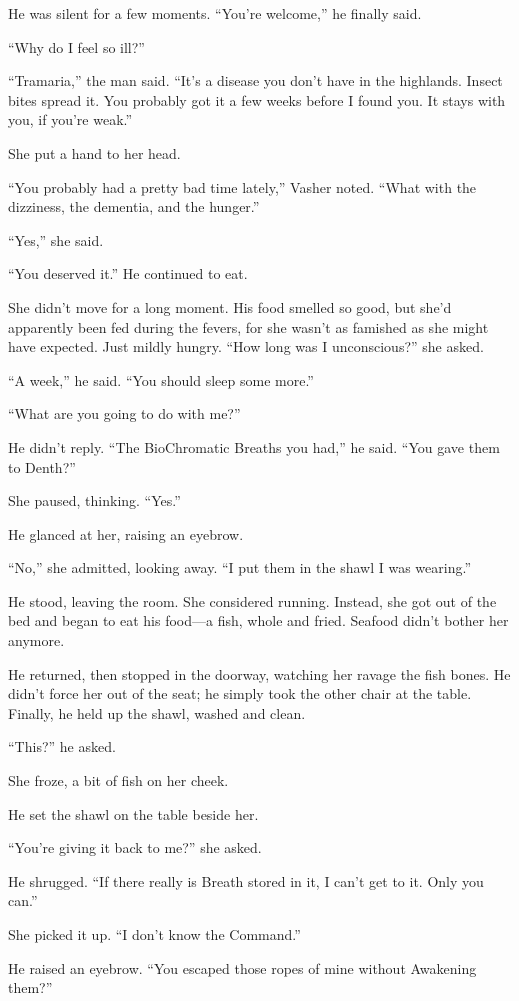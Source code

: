 He was silent for a few moments. “You’re welcome,” he finally said.

“Why do I feel so ill?”

“Tramaria,” the man said. “It’s a disease you don’t have in the highlands. Insect bites spread it. You probably got it a few weeks before I found you. It stays with you, if you’re weak.”

She put a hand to her head.

“You probably had a pretty bad time lately,” Vasher noted. “What with the dizziness, the dementia, and the hunger.”

“Yes,” she said.

“You deserved it.” He continued to eat.

She didn’t move for a long moment. His food smelled so good, but she’d apparently been fed during the fevers, for she wasn’t as famished as she might have expected. Just mildly hungry. “How long was I unconscious?” she asked.

“A week,” he said. “You should sleep some more.”

“What are you going to do with me?”

He didn’t reply. “The BioChromatic Breaths you had,” he said. “You gave them to Denth?”

She paused, thinking. “Yes.”

He glanced at her, raising an eyebrow.

“No,” she admitted, looking away. “I put them in the shawl I was wearing.”

He stood, leaving the room. She considered running. Instead, she got out of the bed and began to eat his food—a fish, whole and fried. Seafood didn’t bother her anymore.

He returned, then stopped in the doorway, watching her ravage the fish bones. He didn’t force her out of the seat; he simply took the other chair at the table. Finally, he held up the shawl, washed and clean.

“This?” he asked.

She froze, a bit of fish on her cheek.

He set the shawl on the table beside her.

“You’re giving it back to me?” she asked.

He shrugged. “If there really is Breath stored in it, I can’t get to it. Only you can.”

She picked it up. “I don’t know the Command.”

He raised an eyebrow. “You escaped those ropes of mine without Awakening them?”

